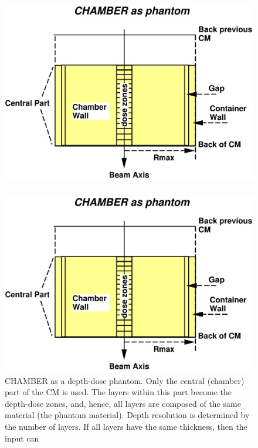 \documentclass[12pt,twoside]{article}
\begin{document}
\begin{figure}[htbp]
\begin{center}
\leavevmode
\mbox{}\hspace{0cm}
\begin{latexonly}
\includegraphics[height=9cm]{figures/chamberphant}
\end{latexonly}
\begin{htmlonly}
\includegraphics[height=8cm]{figures/chamberphant}
\end{htmlonly}
\end{center}
\caption[CHAMBER CM as a phantom]
{CHAMBER as a depth-dose phantom.  Only the central (chamber) part of
the CM is used.  The layers within this part become the depth-dose
zones, and, hence, all layers are composed of the same material (the
phantom material).  Depth resolution is determined by the number of
layers.  If all layers have the same thickness, then the input can
}
\end{figure}
\end{document}
